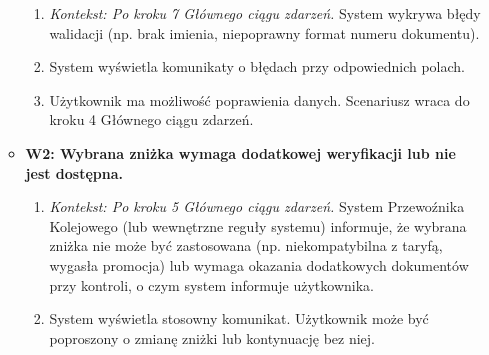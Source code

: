 \documentclass[a4paper,12pt]{article}
\begin{document}
\begin{itemize}
\begin{itemize}
\begin{enumerate}
\item \textit{Kontekst: Po kroku 7 Głównego ciągu zdarzeń.} System wykrywa błędy walidacji (np. brak imienia, niepoprawny format numeru dokumentu).
\item System wyświetla komunikaty o błędach przy odpowiednich polach.
\item Użytkownik ma możliwość poprawienia danych. Scenariusz wraca do kroku 4 Głównego ciągu zdarzeń.
\end{enumerate}
\item \textbf{W2: Wybrana zniżka wymaga dodatkowej weryfikacji lub nie jest dostępna.}
\begin{enumerate}
\item \textit{Kontekst: Po kroku 5 Głównego ciągu zdarzeń.} System Przewoźnika Kolejowego (lub wewnętrzne reguły systemu) informuje, że wybrana zniżka nie może być zastosowana (np. niekompatybilna z taryfą, wygasła promocja) lub wymaga okazania dodatkowych dokumentów przy kontroli, o czym system informuje użytkownika.
\item System wyświetla stosowny komunikat. Użytkownik może być poproszony o zmianę zniżki lub kontynuację bez niej.
\end{enumerate}
\end{itemize}
\end{itemize}
\end{document}
